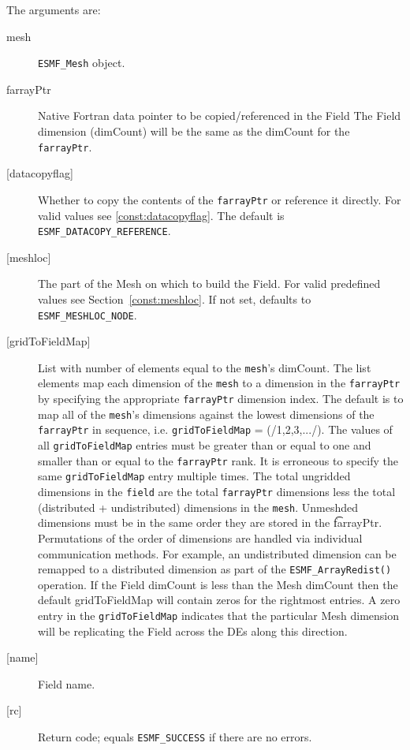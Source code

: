    The arguments are: 
   \begin{description} 
   \item [mesh] 
   {\tt ESMF\_Mesh} object. 
   \item [farrayPtr] 
   Native Fortran data pointer to be copied/referenced in the Field 
   The Field dimension (dimCount) will be the same as the dimCount 
   for the {\tt farrayPtr}. 
   \item [{[datacopyflag]}] 
   Whether to copy the contents of the {\tt farrayPtr} or reference it directly. 
   For valid values see \ref{const:datacopyflag}. The default is 
   {\tt ESMF\_DATACOPY\_REFERENCE}. 
   \item [{[meshloc]}] 
   \begin{sloppypar} 
   The part of the Mesh on which to build the Field. For valid 
   predefined values see Section~\ref{const:meshloc}. 
   If not set, defaults to {\tt ESMF\_MESHLOC\_NODE}. 
   \end{sloppypar} 
   \item [{[gridToFieldMap]}] 
   List with number of elements equal to the 
   {\tt mesh}'s dimCount. The list elements map each dimension 
   of the {\tt mesh} to a dimension in the {\tt farrayPtr} by 
   specifying the appropriate {\tt farrayPtr} dimension index. The default is to 
   map all of the {\tt mesh}'s dimensions against the lowest dimensions of 
   the {\tt farrayPtr} in sequence, i.e. {\tt gridToFieldMap} = (/1,2,3,.../). 
   The values of all {\tt gridToFieldMap} entries must be greater than or equal 
   to one and smaller than or equal to the {\tt farrayPtr} rank. 
   It is erroneous to specify the same {\tt gridToFieldMap} entry 
   multiple times. The total ungridded dimensions in the {\tt field} 
   are the total {\tt farrayPtr} dimensions less 
   the total (distributed + undistributed) dimensions in 
   the {\tt mesh}. Unmeshded dimensions must be in the same order they are 
   stored in the {\t farrayPtr}. Permutations of the order of 
   dimensions are handled via individual communication methods. For example, 
   an undistributed dimension can be remapped to a distributed dimension 
   as part of the {\tt ESMF\_ArrayRedist()} operation. 
   If the Field dimCount is less than the Mesh dimCount then the default 
   gridToFieldMap will contain zeros for the rightmost entries. A zero 
   entry in the {\tt gridToFieldMap} indicates that the particular 
   Mesh dimension will be replicating the Field across the DEs along 
   this direction. 
   \item [{[name]}] 
   Field name. 
   \item [{[rc]}] 
   Return code; equals {\tt ESMF\_SUCCESS} if there are no errors. 
   \end{description} 
    
